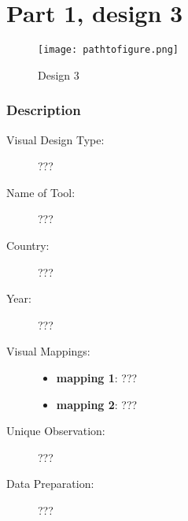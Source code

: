 \hypertarget{part-1-design-3}{%
\section{Part 1, design 3}\label{part-1-design-3}}

\begin{figure}
\centering
\texttt{[image: pathtofigure.png]}
\caption{Design 3}
\end{figure}

\hypertarget{description}{%
\subsubsection{Description}\label{description}}

\begin{description}
\item[Visual Design Type:]
???
\item[Name of Tool:]
???
\item[Country:]
???
\item[Year:]
???
\item[Visual Mappings:]
\begin{itemize}
\tightlist
\item
  \textbf{mapping 1}: ???
\end{itemize}

\begin{itemize}
\tightlist
\item
  \textbf{mapping 2}: ???
\end{itemize}
\item[Unique Observation:]
???
\item[Data Preparation:]
???
\end{description}
